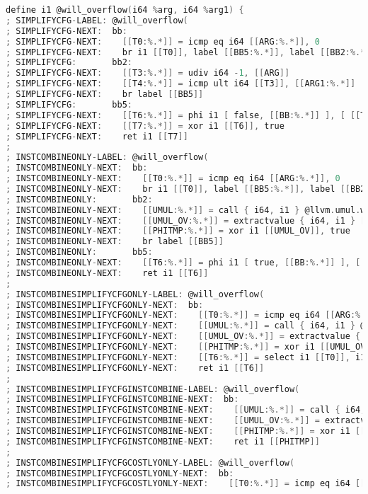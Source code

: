 \documentclass[a4paper]{article}
\theoremstyle{definition}
\begin{document}
\begin{lstlisting}[language=C]
define i1 @will_overflow(i64 %arg, i64 %arg1) {
; SIMPLIFYCFG-LABEL: @will_overflow(
; SIMPLIFYCFG-NEXT:  bb:
; SIMPLIFYCFG-NEXT:    [[T0:%.*]] = icmp eq i64 [[ARG:%.*]], 0
; SIMPLIFYCFG-NEXT:    br i1 [[T0]], label [[BB5:%.*]], label [[BB2:%.*]]
; SIMPLIFYCFG:       bb2:
; SIMPLIFYCFG-NEXT:    [[T3:%.*]] = udiv i64 -1, [[ARG]]
; SIMPLIFYCFG-NEXT:    [[T4:%.*]] = icmp ult i64 [[T3]], [[ARG1:%.*]]
; SIMPLIFYCFG-NEXT:    br label [[BB5]]
; SIMPLIFYCFG:       bb5:
; SIMPLIFYCFG-NEXT:    [[T6:%.*]] = phi i1 [ false, [[BB:%.*]] ], [ [[T4]], [[BB2]] ]
; SIMPLIFYCFG-NEXT:    [[T7:%.*]] = xor i1 [[T6]], true
; SIMPLIFYCFG-NEXT:    ret i1 [[T7]]
;
; INSTCOMBINEONLY-LABEL: @will_overflow(
; INSTCOMBINEONLY-NEXT:  bb:
; INSTCOMBINEONLY-NEXT:    [[T0:%.*]] = icmp eq i64 [[ARG:%.*]], 0
; INSTCOMBINEONLY-NEXT:    br i1 [[T0]], label [[BB5:%.*]], label [[BB2:%.*]]
; INSTCOMBINEONLY:       bb2:
; INSTCOMBINEONLY-NEXT:    [[UMUL:%.*]] = call { i64, i1 } @llvm.umul.with.overflow.i64(i64 [[ARG]], i64 [[ARG1:%.*]])
; INSTCOMBINEONLY-NEXT:    [[UMUL_OV:%.*]] = extractvalue { i64, i1 } [[UMUL]], 1
; INSTCOMBINEONLY-NEXT:    [[PHITMP:%.*]] = xor i1 [[UMUL_OV]], true
; INSTCOMBINEONLY-NEXT:    br label [[BB5]]
; INSTCOMBINEONLY:       bb5:
; INSTCOMBINEONLY-NEXT:    [[T6:%.*]] = phi i1 [ true, [[BB:%.*]] ], [ [[PHITMP]], [[BB2]] ]
; INSTCOMBINEONLY-NEXT:    ret i1 [[T6]]
;
; INSTCOMBINESIMPLIFYCFGONLY-LABEL: @will_overflow(
; INSTCOMBINESIMPLIFYCFGONLY-NEXT:  bb:
; INSTCOMBINESIMPLIFYCFGONLY-NEXT:    [[T0:%.*]] = icmp eq i64 [[ARG:%.*]], 0
; INSTCOMBINESIMPLIFYCFGONLY-NEXT:    [[UMUL:%.*]] = call { i64, i1 } @llvm.umul.with.overflow.i64(i64 [[ARG]], i64 [[ARG1:%.*]])
; INSTCOMBINESIMPLIFYCFGONLY-NEXT:    [[UMUL_OV:%.*]] = extractvalue { i64, i1 } [[UMUL]], 1
; INSTCOMBINESIMPLIFYCFGONLY-NEXT:    [[PHITMP:%.*]] = xor i1 [[UMUL_OV]], true
; INSTCOMBINESIMPLIFYCFGONLY-NEXT:    [[T6:%.*]] = select i1 [[T0]], i1 true, i1 [[PHITMP]]
; INSTCOMBINESIMPLIFYCFGONLY-NEXT:    ret i1 [[T6]]
;
; INSTCOMBINESIMPLIFYCFGINSTCOMBINE-LABEL: @will_overflow(
; INSTCOMBINESIMPLIFYCFGINSTCOMBINE-NEXT:  bb:
; INSTCOMBINESIMPLIFYCFGINSTCOMBINE-NEXT:    [[UMUL:%.*]] = call { i64, i1 } @llvm.umul.with.overflow.i64(i64 [[ARG:%.*]], i64 [[ARG1:%.*]])
; INSTCOMBINESIMPLIFYCFGINSTCOMBINE-NEXT:    [[UMUL_OV:%.*]] = extractvalue { i64, i1 } [[UMUL]], 1
; INSTCOMBINESIMPLIFYCFGINSTCOMBINE-NEXT:    [[PHITMP:%.*]] = xor i1 [[UMUL_OV]], true
; INSTCOMBINESIMPLIFYCFGINSTCOMBINE-NEXT:    ret i1 [[PHITMP]]
;
; INSTCOMBINESIMPLIFYCFGCOSTLYONLY-LABEL: @will_overflow(
; INSTCOMBINESIMPLIFYCFGCOSTLYONLY-NEXT:  bb:
; INSTCOMBINESIMPLIFYCFGCOSTLYONLY-NEXT:    [[T0:%.*]] = icmp eq i64 [[ARG:%.*]], 0

\end{lstlisting}
\end{document}
